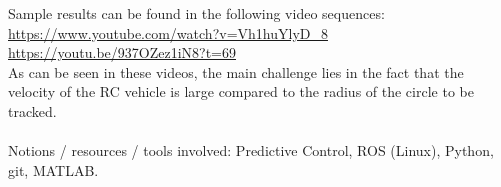 \noindent{}

\noindent Sample results can be found in the following video sequences:\\

\noindent \url{https://www.youtube.com/watch?v=Vh1huYlyD_8}\\
\url{https://youtu.be/937OZez1iN8?t=69}\\

As can be seen in these videos, the main challenge lies in the fact that the
velocity of the RC vehicle is large compared to the radius of the circle to be
tracked.\\\\
Notions / resources / tools involved: Predictive Control, ROS (Linux), Python, git, MATLAB.
